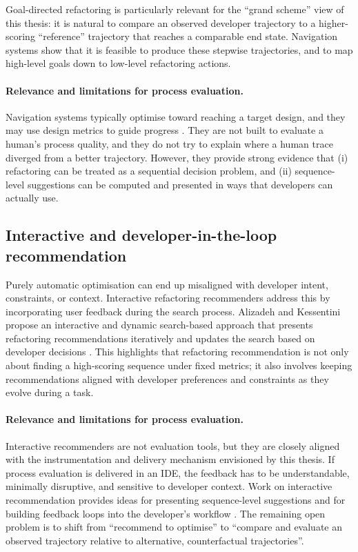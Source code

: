 Goal-directed refactoring is particularly relevant for the ``grand scheme'' view of this thesis: it is natural to compare an observed developer trajectory to a higher-scoring ``reference'' trajectory that reaches a comparable end state. Navigation systems show that it is feasible to produce these stepwise trajectories, and to map high-level goals down to low-level refactoring actions.

\paragraph{Relevance and limitations for process evaluation.}
Navigation systems typically optimise toward reaching a target design, and they may use design metrics to guide progress \cite{lin2016navigator}. They are not built to evaluate a human's process quality, and they do not try to explain where a human trace diverged from a better trajectory. However, they provide strong evidence that (i) refactoring can be treated as a sequential decision problem, and (ii) sequence-level suggestions can be computed and presented in ways that developers can actually use.

\subsection{Interactive and developer-in-the-loop recommendation}
Purely automatic optimisation can end up misaligned with developer intent, constraints, or context. Interactive refactoring recommenders address this by incorporating user feedback during the search process. Alizadeh and Kessentini propose an interactive and dynamic search-based approach that presents refactoring recommendations iteratively and updates the search based on developer decisions \cite{alizadeh2020interactive}. This highlights that refactoring recommendation is not only about finding a high-scoring sequence under fixed metrics; it also involves keeping recommendations aligned with developer preferences and constraints as they evolve during a task.

\paragraph{Relevance and limitations for process evaluation.}
Interactive recommenders are not evaluation tools, but they are closely aligned with the instrumentation and delivery mechanism envisioned by this thesis. If process evaluation is delivered in an IDE, the feedback has to be understandable, minimally disruptive, and sensitive to developer context. Work on interactive recommendation provides ideas for presenting sequence-level suggestions and for building feedback loops into the developer's workflow \cite{alizadeh2020interactive}. The remaining open problem is to shift from ``recommend to optimise'' to ``compare and evaluate an observed trajectory relative to alternative, counterfactual trajectories''.

